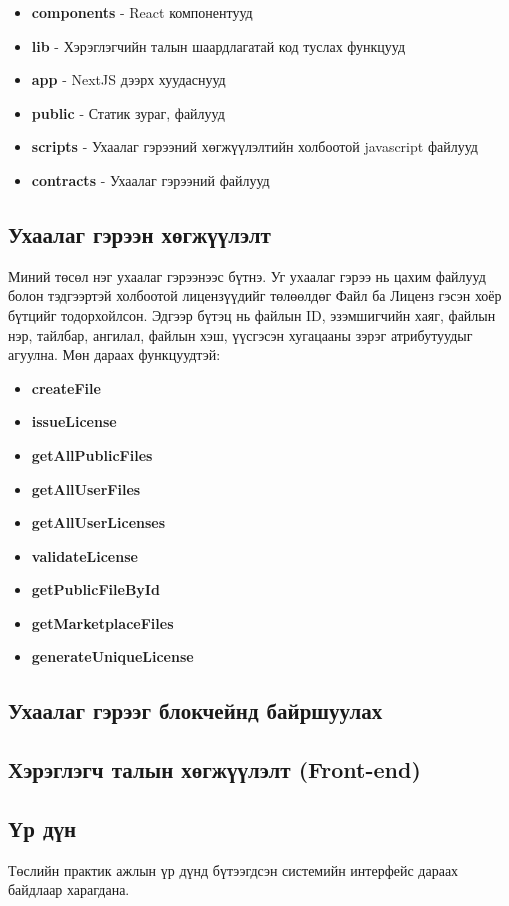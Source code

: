 \begin{itemize}
	\item \textbf{components} - React компонентууд
	\item \textbf{lib} - Хэрэглэгчийн талын шаардлагатай код туслах функцууд
	\item \textbf{app} - NextJS дээрх хуудаснууд
	\item \textbf{public} - Статик зураг, файлууд
	\item \textbf{scripts} - Ухаалаг гэрээний хөгжүүлэлтийн холбоотой  javascript файлууд
	\item \textbf{contracts} - Ухаалаг гэрээний файлууд
\end{itemize}

\subsection{Ухаалаг гэрээн хөгжүүлэлт}
Миний төсөл нэг ухаалаг гэрээнээс бүтнэ.
Уг ухаалаг гэрээ нь цахим файлууд болон тэдгээртэй холбоотой лицензүүдийг төлөөлдөг Файл ба Лиценз гэсэн хоёр бүтцийг тодорхойлсон. Эдгээр бүтэц нь файлын ID, эзэмшигчийн хаяг, файлын нэр, тайлбар, ангилал, файлын хэш, үүсгэсэн хугацааны  зэрэг атрибутуудыг агуулна. Мөн дараах функцуудтэй:

\begin{itemize}
	\item \textbf{createFile}
	\item \textbf{issueLicense}
	\item \textbf{getAllPublicFiles}
	\item \textbf{getAllUserFiles}
	\item \textbf{getAllUserLicenses}
	\item \textbf{validateLicense}
	\item \textbf{getPublicFileById}
	\item \textbf{getMarketplaceFiles}
	\item \textbf{generateUniqueLicense}
\end{itemize}



\subsection{Ухаалаг гэрээг блокчейнд байршуулах}


\subsection{Хэрэглэгч талын хөгжүүлэлт (Front-end)}


\subsection{Үр дүн}
Төслийн практик ажлын үр дүнд бүтээгдсэн  системийн интерфейс дараах байдлаар харагдана.